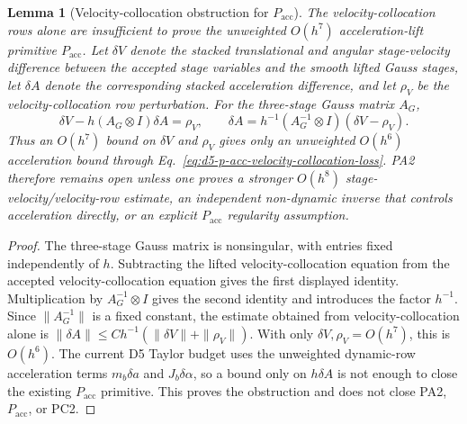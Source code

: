 \documentclass[preprint,12pt]{elsarticle}
\newtheorem{lemma}{Lemma}
\begin{document}
\begin{lemma}[Velocity-collocation obstruction for \(P_{\mathrm{acc}}\)]
\label{lem:d5-p-acc-pa2-obstruction}
The velocity-collocation rows alone are insufficient to prove the unweighted
\(O(h^7)\) acceleration-lift primitive \(P_{\mathrm{acc}}\).  Let
\(\delta V\) denote the stacked translational and angular stage-velocity
difference between the accepted stage variables and the smooth lifted Gauss
stages, let \(\delta A\) denote the corresponding stacked acceleration
difference, and let \(\rho_V\) be the velocity-collocation row perturbation.
For the three-stage Gauss matrix \(A_G\),
\begin{equation}
\label{eq:d5-p-acc-velocity-collocation-loss}
  \delta V-h(A_G\otimes I)\delta A=\rho_V,\qquad
  \delta A=h^{-1}(A_G^{-1}\otimes I)(\delta V-\rho_V).
\end{equation}
Thus an \(O(h^7)\) bound on \(\delta V\) and \(\rho_V\) gives only an
unweighted \(O(h^6)\) acceleration bound through
Eq.~\eqref{eq:d5-p-acc-velocity-collocation-loss}.  PA2
therefore remains open unless one proves a stronger \(O(h^8)\)
stage-velocity/velocity-row estimate, an independent non-dynamic inverse that
controls acceleration directly, or an explicit \(P_{\mathrm{acc}}\)
regularity assumption.
\end{lemma}

\begin{proof}
The three-stage Gauss matrix is nonsingular, with entries fixed
independently of \(h\).  Subtracting the lifted velocity-collocation equation
from the accepted velocity-collocation equation gives the first displayed
identity.  Multiplication by \(A_G^{-1}\otimes I\) gives the second identity
and introduces the factor \(h^{-1}\).  Since \(\|A_G^{-1}\|\) is a fixed
constant, the estimate obtained from velocity-collocation alone is
\(\|\delta A\|\le C h^{-1}(\|\delta V\|+\|\rho_V\|)\).  With only
\(\delta V,\rho_V=O(h^7)\), this is \(O(h^6)\).  The current D5 Taylor budget
uses the unweighted dynamic-row acceleration terms \(m_b\delta a\) and
\(J_b\delta\alpha\), so a bound only on \(h\delta A\) is not enough to close
the existing \(P_{\mathrm{acc}}\) primitive.  This proves the obstruction and
does not close PA2, \(P_{\mathrm{acc}}\), or PC2.
\end{proof}
\end{document}
